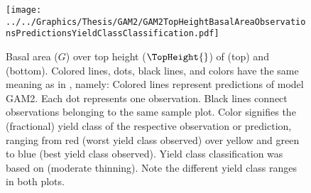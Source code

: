\begin{figure}[h]
  \centering
  \texttt{[image: ../../Graphics/Thesis/GAM2/GAM2TopHeightBasalAreaObservationsPredictionsYieldClassClassification.pdf]}
  \caption{Basal area (\(G\)) over top height (\(\TopHeight{}\)) of \Beech{} (top) and \Spruce{} (bottom).  Colored lines, dots, black lines, and colors have the same meaning as in , namely:  Colored lines represent predictions of model GAM2.  Each dot represents one observation.  Black lines connect observations belonging to the same sample plot.  Color signifies the (fractional) yield class of the respective observation or prediction, ranging from red (worst yield class observed) over yellow and green to blue (best yield class observed). Yield class classification was based on \textcite{Schober1995} (moderate thinning).  Note the different yield class ranges in both plots.}
  \label{fig:GAM2TopHeightBasalAreaObservationsPredictionsYieldClassClassification}
\end{figure}

\clearpage{}

